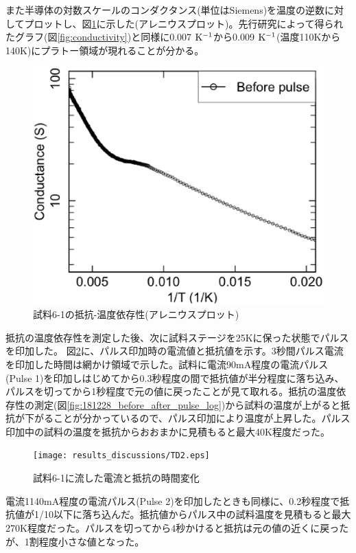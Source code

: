 また半導体の対数スケールのコンダクタンス(単位はSiemens)を温度の逆数に対してプロットし、図\ref{fig:181213_before_pulse_Tinv}に示した(アレニウスプロット)。先行研究\cite{Kohnke}によって得られたグラフ(図\ref{fig:conductivity})と同様に0.007 $\rm  K^{-1}$から0.009 $\rm  K^{-1}$(温度110Kから140K)にプラトー領域が現れることが分かる。
\begin{figure}[!h]
    \begin{center}
   \includegraphics[width=0.6\hsize]{results_discussions/Tinv.eps}
  \end{center}
  \caption{試料6-1の抵抗-温度依存性(アレニウスプロット)}
  \label{fig:181213_before_pulse_Tinv}
  \end{figure}

抵抗の温度依存性を測定した後、次に試料ステージを25Kに保った状態でパルスを印加した。
図\ref{fig:181213_comparison_selected}に、パルス印加時の電流値と抵抗値を示す。3秒間パルス電流を印加した時間は網かけ領域で示した。試料に電流90mA程度の電流パルス(Pulse 1)を印加しはじめてから0.3秒程度の間で抵抗値が半分程度に落ち込み、パルスを切ってから1秒程度で元の値に戻ったことが見て取れる。抵抗の温度依存性の測定(図\ref{fig:181228_before_after_pulse_log})から試料の温度が上がると抵抗が下がることが分かっているので、パルス印加により温度が上昇した。パルス印加中の試料の温度を抵抗からおおまかに見積もると最大40K程度だった。
  \begin{figure}[!h]
    \begin{center}
   \texttt{[image: results\_discussions/TD2.eps]}
  \end{center}
  \caption{試料6-1に流した電流と抵抗の時間変化%
  }
  \label{fig:181213_comparison_selected}
  \end{figure}

電流1140mA程度の電流パルス(Pulse 2)を印加したときも同様に、0.2秒程度で抵抗値が1/10以下に落ち込んだ。抵抗値からパルス中の試料温度を見積もると最大270K程度だった。パルスを切ってから4秒かけると抵抗は元の値の近くに戻ったが、1割程度小さな値となった。

